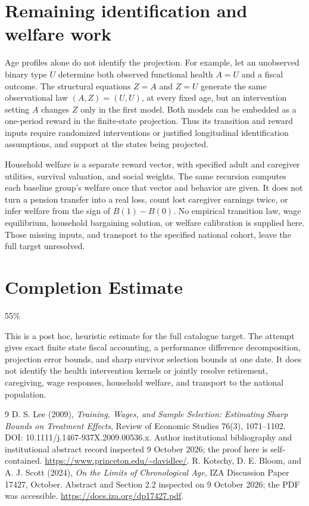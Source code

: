 \documentclass[11pt]{article}
\theoremstyle{remark}
\begin{document}
\section{Remaining identification and welfare work}
Age profiles alone do not identify the projection. For example, let an unobserved binary type $U$ determine both observed functional health $A=U$ and a fiscal outcome. The structural equations $Z=A$ and $Z=U$ generate the same observational law $(A,Z)=(U,U)$, at every fixed age, but an intervention setting $A$ changes $Z$ only in the first model. Both models can be embedded as a one-period reward in the finite-state projection. Thus its transition and reward inputs require randomized interventions or justified longitudinal identification assumptions, and support at the states being projected.

Household welfare is a separate reward vector, with specified adult and caregiver utilities, survival valuation, and social weights. The same recursion computes each baseline group's welfare once that vector and behavior are given. It does not turn a pension transfer into a real loss, count lost caregiver earnings twice, or infer welfare from the sign of $B(1)-B(0)$. No empirical transition law, wage equilibrium, household bargaining solution, or welfare calibration is supplied here. Those missing inputs, and transport to the specified national cohort, leave the full target unresolved.

\section{Completion Estimate}
55\%

This is a post hoc, heuristic estimate for the full catalogue target.
The attempt gives exact finite state fiscal accounting, a performance difference decomposition, projection error bounds, and sharp survivor selection bounds at one date. It does not identify the health intervention kernels or jointly resolve retirement, caregiving, wage responses, household welfare, and transport to the national population.

\begin{thebibliography}{9}
 D. S. Lee (2009), \emph{Training, Wages, and Sample Selection: Estimating Sharp Bounds on Treatment Effects}, Review of Economic Studies 76(3), 1071--1102. DOI: 10.1111/j.1467-937X.2009.00536.x. Author institutional bibliography and institutional abstract record inspected 9 October 2026; the proof here is self-contained. \url{https://www.princeton.edu/~davidlee/}.
 R. Kotschy, D. E. Bloom, and A. J. Scott (2024), \emph{On the Limits of Chronological Age}, IZA Discussion Paper 17427, October. Abstract and Section 2.2 inspected on 9 October 2026; the PDF was accessible. \url{https://docs.iza.org/dp17427.pdf}.
\end{thebibliography}
\end{document}

